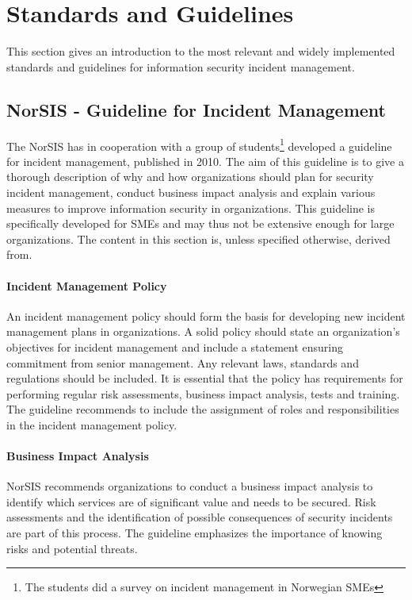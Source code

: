 \section{Standards and Guidelines}
This section gives an introduction to the most relevant and widely implemented standards and guidelines for information security incident management. 
\label{section:standardsandguidelines}







\subsection{NorSIS - Guideline for Incident Management}
\label{sec:NorSIS}
The \ac{NorSIS} has in cooperation with a group of students\footnote{The students did a survey on incident management in Norwegian \acsp{SME}\cite{sand2010hendelseshaandtering}} developed a guideline for incident management, published in 2010\cite{norsisveiledning}. The aim of this guideline is to give a thorough description of why and how organizations should plan for security incident management, conduct business impact analysis and explain various measures to improve information security in organizations. This guideline is specifically developed for \acp{SME} and may thus not be extensive enough for large organizations. The content in this section is, unless specified otherwise, derived from\cite{norsisveiledning}.

\paragraph{Incident Management Policy} 
An incident management policy should form the basis for developing new incident management plans in organizations. A solid policy should state an organization's objectives for incident management and include a statement ensuring commitment from senior management. Any relevant laws, standards and regulations should be included. It is essential that the policy has requirements for performing regular risk assessments, business impact analysis, tests and training. The guideline recommends to include the assignment of roles and responsibilities in the incident management policy.

\paragraph{Business Impact Analysis}
NorSIS recommends organizations to conduct a business impact analysis to identify which services are of significant value and needs to be secured. Risk assessments and the identification of possible consequences of security incidents are part of this process. The guideline emphasizes the importance of knowing risks and potential threats.  

